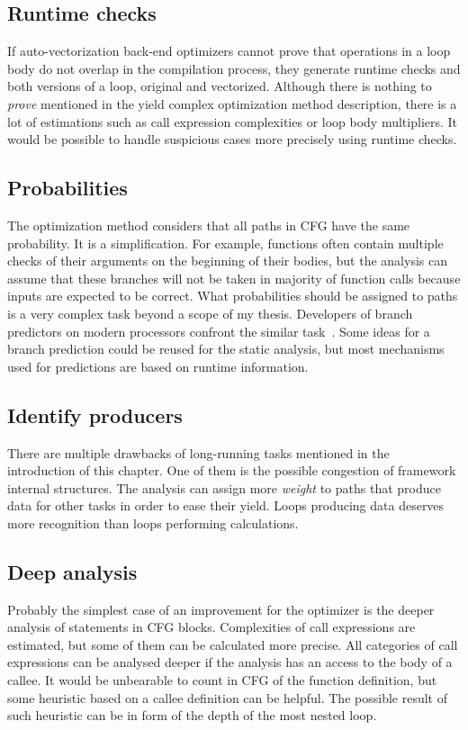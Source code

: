 \subsection{Runtime checks}
If auto-vectorization back-end optimizers cannot prove that operations in a loop body do not overlap in the compilation process, they generate runtime checks and both versions of a loop, original and vectorized. Although there is nothing to \emph{prove} mentioned in the yield complex optimization method description, there is a lot of estimations such as call expression complexities or loop body multipliers. It would be possible to handle suspicious cases more precisely using runtime checks.

\subsection{Probabilities}
The optimization method considers that all paths in CFG have the same probability. It is a simplification. For example, functions often contain multiple checks of their arguments on the beginning of their bodies, but the analysis can assume that these branches will not be taken in majority of function calls because inputs are expected to be correct. What probabilities should be assigned to paths is a very complex task beyond a scope of my thesis. Developers of branch predictors on modern processors confront the similar task~\cite{branch-predictor}. Some ideas for a branch prediction could be reused for the static analysis, but most mechanisms used for predictions are based on runtime information.

\subsection{Identify producers}
There are multiple drawbacks of long-running tasks mentioned in the introduction of this chapter. One of them is the possible congestion of framework internal structures. The analysis can assign more \emph{weight} to paths that produce data for other tasks in order to ease their yield. Loops producing data deserves more recognition than loops performing calculations.

\subsection{Deep analysis}
Probably the simplest case of an improvement for the optimizer is the deeper analysis of statements in CFG blocks. Complexities of call expressions are estimated, but some of them can be calculated more precise. All categories of call expressions can be analysed deeper if the analysis has an access to the body of a callee. It would be unbearable to count in CFG of the function definition, but some heuristic based on a callee definition can be helpful. The possible result of such heuristic can be in form of the depth of the most nested loop.
